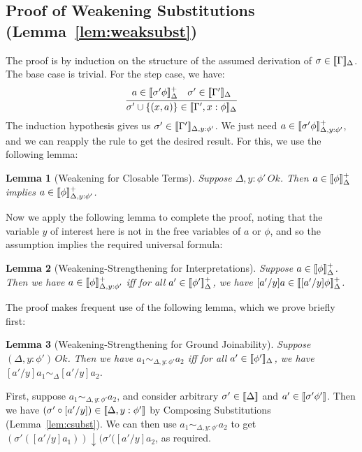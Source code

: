 \documentclass[copyright]{eptcs}
\newtheorem{lemma}{Lemma}
\newcommand{\interp}[1]{[\negthinspace[#1]\negthinspace]}
\begin{document}
\subsection{Proof of Weakening Substitutions (Lemma~\ref{lem:weaksubst})}
\label{sec:weaksubst}

\noindent The proof is by induction on the structure of the assumed
derivation of $\sigma\in\interp{\Gamma}_{\Delta}$.  The base case is
trivial.  For the step case, we have:
\[
\infer{\sigma'\cup\{(x,a)\}\in\interp{\Gamma',x:\phi}_{\Delta}}
      {a\in\interp{\sigma'\phi}^+_{\Delta} & \sigma' \in\interp{\Gamma'}_{\Delta}}
\]
\noindent The induction hypothesis gives us
$\sigma'\in\interp{\Gamma'}_{\Delta,y:\phi'}$.  We just need
$a\in\interp{\sigma'\phi}^+_{\Delta,y:\phi'}$, and we can
reapply the rule to get the desired result.  For this, we use the
following lemma:

\begin{lemma}[Weakening for Closable Terms]
\label{lem:weakclose}
Suppose $\Delta,y:\phi'\,\textit{Ok}$.  Then
$a\in\interp{\phi}^+_{\Delta}$ implies
$a\in\interp{\phi}^+_{\Delta,y:\phi'}$.
\end{lemma}

\noindent Now we apply the following lemma to complete the proof,
noting that the variable $y$ of interest here is not in the free
variables of $a$ or $\phi$, and so the assumption implies the required
universal formula:

\begin{lemma}[Weakening-Strengthening for Interpretations]
\label{lem:weakstr}
Suppose $a\in\interp{\phi}^+_\Delta$.  Then we have
$a\in\interp{\phi}^+_{\Delta,y:\phi'}$ iff for all
$a'\in\interp{\phi'}^+_\Delta$, we have $[a'/y]a\in\interp{[a'/y]
  \phi}^+_{\Delta}$.
\end{lemma}

\noindent The proof makes frequent use of the following lemma, which
we prove briefly first:

\begin{lemma}[Weakening-Strengthening for Ground Joinability]
\label{lem:weakstrj}
Suppose $(\Delta,y:\phi')\,\textit{Ok}$.  Then we have
$a_1\sim_{\Delta,y:\phi'} a_2$ iff for all
$a'\in\interp{\phi'}_\Delta$, we have $[a'/y] a_1\sim_{\Delta}
[a'/y]a_2$.
\end{lemma}

\noindent First, suppose $a_1 \sim_{\Delta,y:\phi'} a_2$, and consider
arbitrary $\sigma'\in\interp{\Delta}$ and
$a'\in\interp{\sigma'\phi'}$.  Then we have
$(\sigma'\circ[a'/y])\in\interp{\Delta,y:\phi'}$ by Composing
Substitutions (Lemma~\ref{lem:csubst}).  We can then use $a_1
\sim_{\Delta,y:\phi'} a_2$ to get $(\sigma'([a'/y]a_1))\downarrow
(\sigma'([a'/y]a_2$, as required.  
\end{document}
